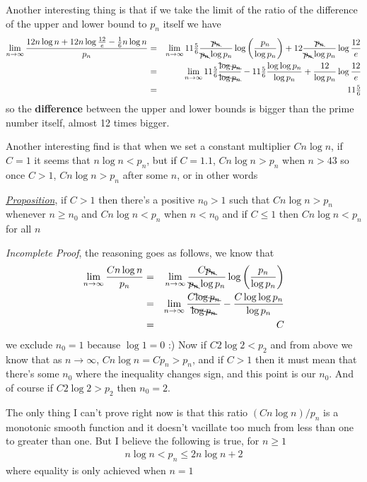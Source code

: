 \documentclass[aps,preprint,preprintnumbers,nofootinbib,showpacs,prd]{revtex4-1}
\newcommand{\nbea}{\begin{eqnarray*}}
\newcommand{\neea}{\end{eqnarray*}}
\begin{document}
Another interesting thing is that if we take the limit of the ratio of the difference of the upper and lower bound to $p_n$ itself we have
%
\nbea
\lim_{n\to\infty} \frac{12 n \log n + 12 n \log\frac{12}{e} - \tfrac{1}{6} n \log n}{p_n} & = & \lim_{n\to\infty} 11\tfrac{5}{6} \frac{\bcancel{p_n}}{\bcancel{p_n}\log p_n} \log \left ( \frac{p_n}{\log p_n}\right ) + 12 \frac{\bcancel{p_n}}{\bcancel{p_n}\log p_n} \log\frac{12}{e} \\
& = & \lim_{n\to\infty} 11\tfrac{5}{6} \frac{\bcancel{\log p_n}}{\bcancel{\log p_n}} - 11\tfrac{5}{6} \frac{\log \log p_n}{\log p_n} + \frac{12}{\log p_n} \log\frac{12}{e} \\
& = & 11\tfrac{5}{6}
\neea
%
so the {\bf difference} between the upper and lower bounds is bigger than the prime number itself, almost 12 times bigger.

Another interesting find is that when we set a constant multiplier $C n\log n$, if $C = 1$ it seems that $n\log n < p_n$, but if $C=1.1$, $C n \log n > p_n$ when $n > 43$ so once $C > 1$, $Cn\log n > p_n$ after some $n$, or in other words

\underline{\textit {Proposition}}, if $C > 1$ then there's a positive $n_0 > 1$ such that $Cn\log n > p_n$ whenever $n \ge n_0$ and $Cn\log n < p_n$ when $n < n_0$ and if $C\le1$ then $C n\log n < p_n$ for all $n$

{\it Incomplete Proof}, the reasoning goes as follows, we know that
%
\nbea
\lim_{n\to\infty}\frac{Cn\log n}{p_n} & = &  \lim_{n\to\infty} \frac{C \bcancel{p_n}}{\bcancel{p_n}\log p_n} \log \left ( \frac{p_n}{\log p_n}\right ) \\
& = & \lim_{n\to\infty} \frac{C \bcancel{\log p_n}}{\bcancel{\log p_n}} - \frac{C \log \log p_n}{\log p_n} \\
& = & C
\neea
%
we exclude $n_0 = 1$ because $\log 1 = 0$ :) Now if $C 2 \log 2 < p_2$ and from above we know that as $n\to\infty$, $Cn\log n = C p_n > p_n$, and if $C > 1$ then it must mean that there's some $n_0$ where the inequality changes sign, and this point is our $n_0$. And of course if $C2 \log 2 > p_2$ then $n_0 = 2$.

The only thing I can't prove right now is that this ratio $(Cn\log n)/p_n$ is a monotonic smooth function and it doesn't vacillate too much from less than one to greater than one. But I believe the following is true, for $n \ge 1$
%
\nbea
n\log n < p_n \le 2n\log n + 2
\neea
%
where equality is only achieved when $n=1$
\end{document}
